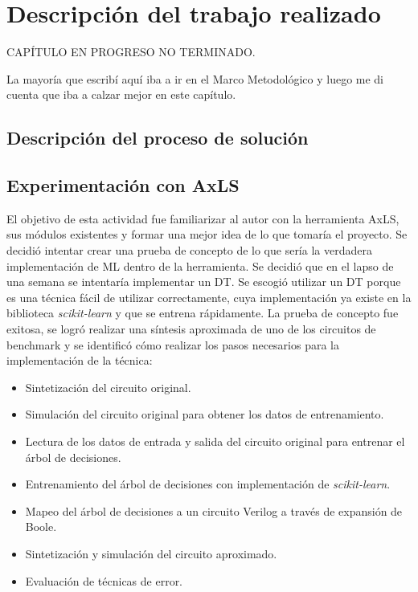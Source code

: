 \chapter{Descripción del trabajo realizado}

CAPÍTULO EN PROGRESO NO TERMINADO.

La mayoría que escribí aquí iba a ir en el Marco Metodológico y luego me di
cuenta que iba a calzar mejor en este capítulo.


\section{Descripción del proceso de solución}



\section{Experimentación con AxLS}

El objetivo de esta actividad fue familiarizar al autor con la herramienta AxLS,
sus módulos existentes y formar una mejor idea de lo que tomaría el proyecto.
Se decidió intentar crear una prueba de concepto de lo que sería la verdadera
implementación de ML dentro de la herramienta.
Se decidió que en el lapso de una semana se intentaría implementar un DT. Se
escogió utilizar un DT porque es una técnica fácil de utilizar correctamente,
cuya implementación ya existe en la biblioteca \emph{scikit-learn} y que se
entrena rápidamente.
La prueba de concepto fue exitosa, se logró realizar una síntesis aproximada de
uno de los circuitos de benchmark y se identificó cómo realizar los pasos
necesarios para la implementación de la técnica:

\begin{itemize}
    \item Sintetización del circuito original.
    \item Simulación del circuito original para obtener los datos de entrenamiento.
    \item Lectura de los datos de entrada y salida del circuito original para
      entrenar el árbol de decisiones.
    \item Entrenamiento del árbol de decisiones con implementación de
      \emph{scikit-learn}.
    \item Mapeo del árbol de decisiones a un circuito Verilog a través de
      expansión de Boole.
    \item Sintetización y simulación del circuito aproximado.
    \item Evaluación de técnicas de error.
\end{itemize}

